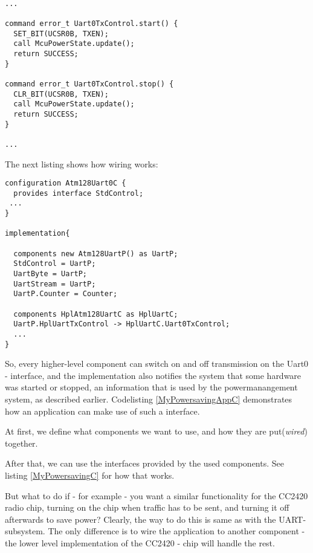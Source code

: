 \lstset{language=C}
\begin{lstlisting}

...

command error_t Uart0TxControl.start() {
  SET_BIT(UCSR0B, TXEN);
  call McuPowerState.update();
  return SUCCESS;
}

command error_t Uart0TxControl.stop() {
  CLR_BIT(UCSR0B, TXEN);
  call McuPowerState.update();
  return SUCCESS;
}

...

\end{lstlisting}

The next listing shows how wiring works: 

\lstset{language=C}
\begin{lstlisting}
configuration Atm128Uart0C {
  provides interface StdControl;
 ...
}

implementation{

  components new Atm128UartP() as UartP;
  StdControl = UartP;
  UartByte = UartP;
  UartStream = UartP;
  UartP.Counter = Counter;

  components HplAtm128UartC as HplUartC;
  UartP.HplUartTxControl -> HplUartC.Uart0TxControl;
  ...
}
\end{lstlisting}

So, every higher-level component can switch on and off transmission on the Uart0 - interface, and the implementation also notifies the system that some hardware was started or stopped, an information that is used by the powermanangement system, as described earlier. Codelisting \ref{MyPowersavingAppC} demonstrates how an application can make use of such a interface.

At first, we define what components we want to use, and how they are put(\textit{wired}) together.



After that, we can use the interfaces provided by the used components. See listing \ref{MyPowersavingC} for how that works.



But what to do if - for example - you want a similar functionality for the CC2420 radio chip, turning on the chip when traffic has to be sent, and turning it off afterwards to save power? Clearly, the way to do this is same as with the UART-subsystem. The only difference is to wire the application to another component - the lower level implementation of the CC2420 - chip will handle the rest. 

